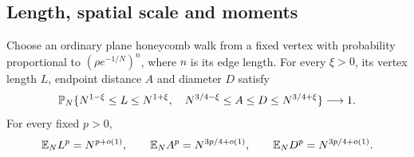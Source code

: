 \subsection{Length, spatial scale and moments}
\begin{samepage}
\begin{theorem}\label{thm:thermal}\label{R:thermal:law}
Choose an ordinary plane honeycomb walk from a fixed vertex with probability proportional to $(\rho e^{-1/N})^n$, where $n$ is its edge length. For every $\xi>0$, its vertex length $L$, endpoint distance $A$ and diameter $D$ satisfy
\[
 \mathbb P_N\{N^{1-\xi}\le L\le N^{1+\xi},\quad
 N^{3/4-\xi}\le A\le D\le N^{3/4+\xi}\}\longrightarrow1.
\]
For every fixed $p>0$,
\[
 \mathbb E_N L^p=N^{p+o(1)},\qquad
 \mathbb E_N A^p=N^{3p/4+o(1)},\qquad
 \mathbb E_N D^p=N^{3p/4+o(1)}.
\]
\end{theorem}
\end{samepage}
